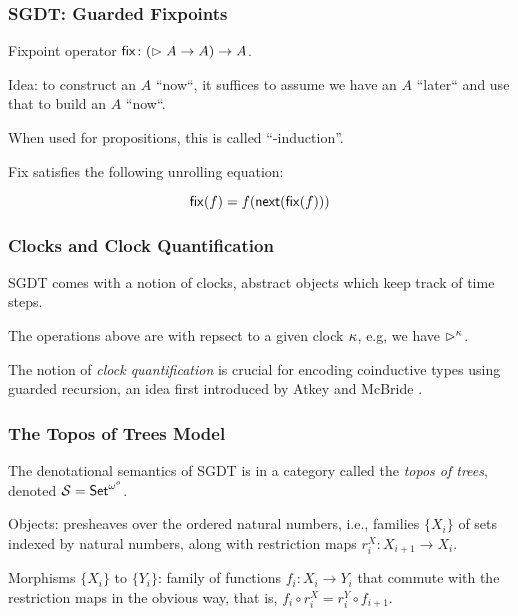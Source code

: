 \documentclass[
	11pt, %
]{beamer}
\begin{document}
\begin{frame}
	\frametitle{SGDT: Guarded Fixpoints}

	Fixpoint operator $\mathsf{fix} \colon (\vartriangleright A \to A) \to A$.
	
	\medskip

	Idea: to construct an $A$ ``now``, it suffices to assume we have an $A$ ``later`` and use that
	to build an $A$ ``now``.

	\medskip

	When used for propositions, this is called ``\lob-induction''.

	\medskip

	Fix satisfies the following unrolling equation:

	\[ \mathsf{fix}(f) = f (\mathsf{next} (\mathsf{fix}(f))) \]

\end{frame}

\begin{frame}
	\frametitle{Clocks and Clock Quantification}

	SGDT comes with a notion of clocks, abstract objects which keep track of time steps.

	\medskip

	The operations above are with repsect to a given clock $\kappa$, e.g, we have $\vartriangleright^\kappa$.

	\medskip

	The notion of \emph{clock quantification} is crucial for encoding coinductive types using guarded
    recursion, an idea first introduced by Atkey and McBride \cite{AM2013}.


\end{frame}

\begin{frame}
	\frametitle{The Topos of Trees Model}

	The denotational semantics of SGDT is in a category called the \emph{topos of trees}, denoted $\mathcal{S} = \mathsf{Set}^{\omega^o}$.

	\medskip

	Objects: presheaves over the ordered natural numbers, i.e., families $\{X_i\}$ of sets
	indexed by natural numbers, along with restriction maps $r^X_i \colon X_{i+1} \to X_i$.

	\medskip

	Morphisms $\{X_i\}$ to $\{Y_i\}$: family of functions $f_i \colon X_i \to Y_i$
	that commute with the restriction maps in the obvious way, that is,
	$f_i \circ r^X_i = r^Y_i \circ f_{i+1}$.

	\medskip


	
\end{frame}
\end{document}

